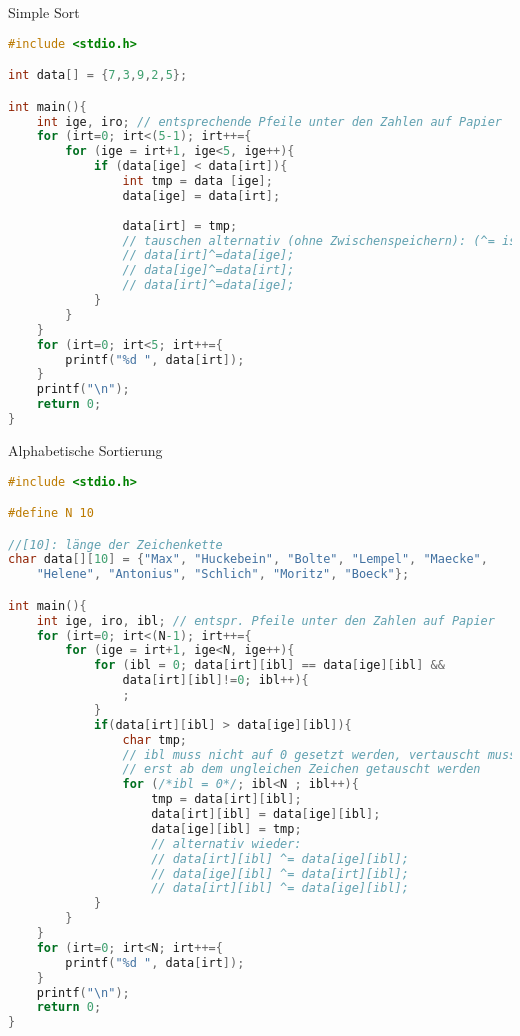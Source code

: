 Simple Sort

\begin{lstlisting}[language=C]
#include <stdio.h>

int data[] = {7,3,9,2,5};

int main(){
	int ige, iro; // entsprechende Pfeile unter den Zahlen auf Papier
	for (irt=0; irt<(5-1); irt++={
		for (ige = irt+1, ige<5, ige++){
			if (data[ige] < data[irt]){
				int tmp = data [ige];
				data[ige] = data[irt];
				
				data[irt] = tmp;
				// tauschen alternativ (ohne Zwischenspeichern): (^= ist XOR)
				// data[irt]^=data[ige];
				// data[ige]^=data[irt];
				// data[irt]^=data[ige];
			}
		}	
	}
	for (irt=0; irt<5; irt++={
		printf("%d ", data[irt]);
	}
	printf("\n");
	return 0;
}
\end{lstlisting}

Alphabetische Sortierung

\begin{lstlisting}[language=C]
#include <stdio.h>

#define N 10

//[10]: länge der Zeichenkette
char data[][10] = {"Max", "Huckebein", "Bolte", "Lempel", "Maecke", 
	"Helene", "Antonius", "Schlich", "Moritz", "Boeck"};

int main(){
	int ige, iro, ibl; // entspr. Pfeile unter den Zahlen auf Papier
	for (irt=0; irt<(N-1); irt++={
		for (ige = irt+1, ige<N, ige++){
			for (ibl = 0; data[irt][ibl] == data[ige][ibl] && 
				data[irt][ibl]!=0; ibl++){
				;
			}
			if(data[irt][ibl] > data[ige][ibl]){
				char tmp;
				// ibl muss nicht auf 0 gesetzt werden, vertauscht muss sowieso
				// erst ab dem ungleichen Zeichen getauscht werden
				for (/*ibl = 0*/; ibl<N ; ibl++){
					tmp = data[irt][ibl];
					data[irt][ibl] = data[ige][ibl];
					data[ige][ibl] = tmp;
					// alternativ wieder:
					// data[irt][ibl] ^= data[ige][ibl];
					// data[ige][ibl] ^= data[irt][ibl];
					// data[irt][ibl] ^= data[ige][ibl];
			}
		}	
	}
	for (irt=0; irt<N; irt++={
		printf("%d ", data[irt]);
	}
	printf("\n");
	return 0;
}
\end{lstlisting}

